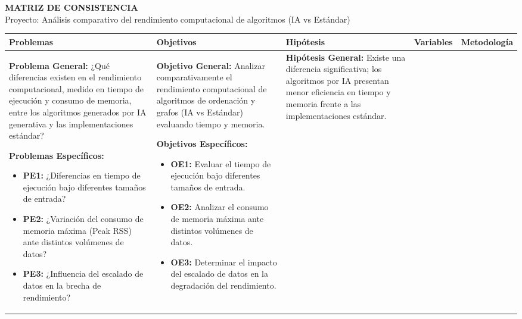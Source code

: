 \documentclass[14pt,a4paper]{extarticle} %
\begin{document}
\begin{landscape}
\thispagestyle{empty}
\begin{center}
    \textbf{\Large MATRIZ DE CONSISTENCIA} \\
    \vspace{0.2cm}
    \small Proyecto: Análisis comparativo del rendimiento computacional de algoritmos (IA vs Estándar)
\end{center}

\vspace{0.3cm}

\noindent
\begin{tabularx}{\linewidth}{|Y|Y|Y|Y|Y|}
\hline
{} 
\textbf{Problemas} & \textbf{Objetivos} & \textbf{Hipótesis} & \textbf{Variables} & \textbf{Metodología} \\ \hline

\textbf{Problema General:} \newline
¿Qué diferencias existen en el rendimiento computacional, medido en tiempo de ejecución y consumo de memoria, entre los algoritmos generados por IA generativa y las implementaciones estándar? \newline

\textbf{Problemas Específicos:}
\begin{itemize}[leftmargin=*, nosep, itemsep=6pt] %
    \item \textbf{PE1:} ¿Diferencias en tiempo de ejecución bajo diferentes tamaños de entrada?
    \item \textbf{PE2:} ¿Variación del consumo de memoria máxima (Peak RSS) ante distintos volúmenes de datos?
    \item \textbf{PE3:} ¿Influencia del escalado de datos en la brecha de rendimiento?
\end{itemize} 
& 
\textbf{Objetivo General:} \newline
Analizar comparativamente el rendimiento computacional de algoritmos de ordenación y grafos (IA vs Estándar) evaluando tiempo y memoria. \newline

\textbf{Objetivos Específicos:}
\begin{itemize}[leftmargin=*, nosep, itemsep=6pt]
    \item \textbf{OE1:} Evaluar el tiempo de ejecución bajo diferentes tamaños de entrada.
    \item \textbf{OE2:} Analizar el consumo de memoria máxima ante distintos volúmenes de datos.
    \item \textbf{OE3:} Determinar el impacto del escalado de datos en la degradación del rendimiento.
\end{itemize} 
& 
\textbf{Hipótesis General:} \newline
Existe una diferencia significativa; los algoritmos por IA presentan menor eficiencia en tiempo y memoria frente a las implementaciones estándar. \newline


\end{tabularx}
\end{landscape}
\end{document}
